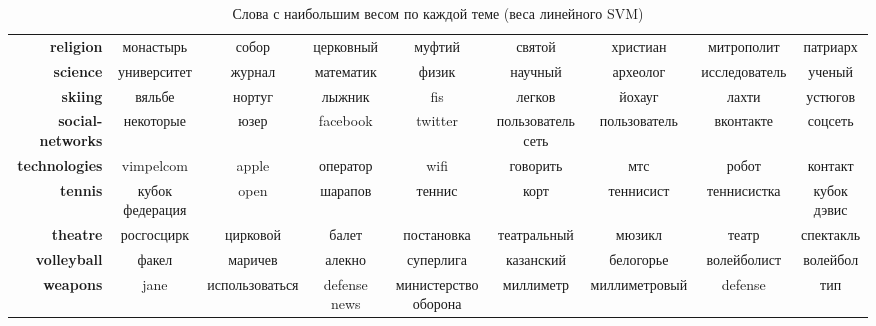 \documentclass[a4paper, 14pt]{extarticle}
\begin{document}
\begin{table}[h]
{\begin{tabular}{r|cccccccc}
			\textbf{religion}        &          монастырь &           собор &          церковный &                муфтий &                святой &       христиан &       митрополит &        патриарх \\
			\textbf{science}         &        университет &          журнал &          математик &                 физик &               научный &       археолог &    исследователь &          ученый \\
			\textbf{skiing}          &             вяльбе &          нортуг &             лыжник &                   fis &                легков &         йохауг &            лахти &         устюгов \\
			\textbf{social-networks} &          некоторые &            юзер &           facebook &               twitter &     пользователь сеть &   пользователь &        вконтакте &         соцсеть \\
			\textbf{technologies}    &          vimpelcom &           apple &           оператор &                  wifi &              говорить &            мтс &            робот &         контакт \\
			\textbf{tennis}          &    кубок федерация &            open &            шарапов &                теннис &                  корт &      теннисист &      теннисистка &     кубок дэвис \\
			\textbf{theatre}         &         росгосцирк &        цирковой &              балет &            постановка &           театральный &         мюзикл &            театр &       спектакль \\
			\textbf{volleyball}      &              факел &         маричев &             алекно &             суперлига &             казанский &      белогорье &      волейболист &        волейбол \\
			\textbf{weapons}         &               jane &  использоваться &       defense news &  министерство оборона &             миллиметр &  миллиметровый &          defense &             тип \\
			\bottomrule
	\end{tabular}}
	\caption{Слова с наибольшим весом по каждой теме (веса линейного SVM)}
	\label{table:svm_topwords}
\end{table}
\end{document}
